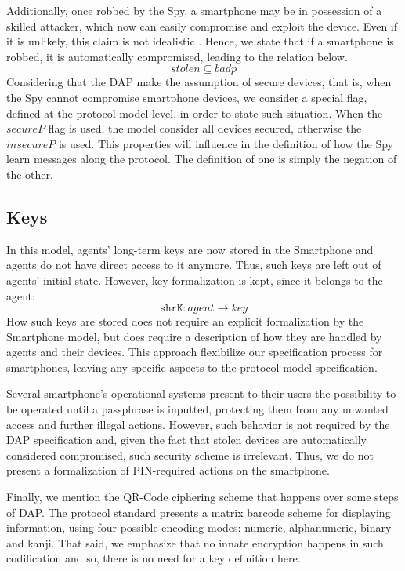 Additionally, once robbed by the Spy, a smartphone may be in possession of a skilled attacker, which now can easily compromise and exploit the device. Even if it is unlikely, this claim is not idealistic \cite{Rao2015}. Hence, we state that if a smartphone is robbed, it is automatically compromised, leading to the relation below.
%
$$stolen \subseteq badp$$
%
Considering that the DAP make the assumption of secure devices, that is, when the Spy cannot compromise smartphone devices, we consider a special flag, defined at the protocol model level, in order to state such situation. When the \(secureP\) flag is used, the model consider all devices secured, otherwise the \(insecureP\) is used. This properties will influence in the definition of how the Spy learn messages along the protocol. The definition of one is simply the negation of the other.



\subsection{Keys}
In this model, agents' long-term keys are now stored in the Smartphone and agents do not have direct access to it anymore. Thus, such keys are left out of agents' initial state. However, key formalization is kept, since it belongs to the agent:
%
$$\texttt{shrK} : agent \longrightarrow key$$
%
How such keys are stored does not require an explicit formalization by the Smartphone model, but does require a description of how they are handled by agents and their devices. This approach flexibilize our specification process for smartphones, leaving any specific aspects to the protocol model specification.

Several smartphone's operational systems present to their users the possibility to be operated until a passphrase is inputted, protecting them from any unwanted access and further illegal actions. However, such behavior is not required by the DAP specification and, given the fact that stolen devices are automatically considered compromised, such security scheme is irrelevant. Thus, we do not present a formalization of PIN-required actions on the smartphone.

Finally, we mention the QR-Code ciphering scheme that happens over some steps of DAP. The protocol standard \cite{ISO13586} presents a matrix barcode scheme for displaying information, using four possible encoding modes: numeric, alphanumeric, binary and kanji. That said, we emphasize that no innate encryption happens in such codification and so, there is no need for a key definition here.



